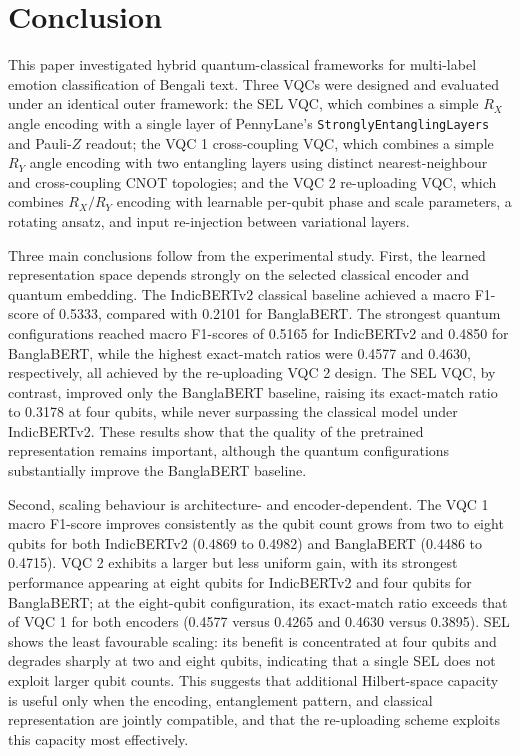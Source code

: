\documentclass[runningheads]{llncs}
\begin{document}
\section{Conclusion}\label{sec:conclusion}
This paper investigated hybrid quantum-classical frameworks for multi-label emotion classification of Bengali text. Three VQCs were designed and evaluated under an identical outer framework: the SEL VQC, which combines a simple $R_X$ angle encoding with a single layer of PennyLane's \texttt{StronglyEntanglingLayers} and Pauli-$Z$ readout; the VQC 1 cross-coupling VQC, which combines a simple $R_Y$ angle encoding with two entangling layers using distinct nearest-neighbour and cross-coupling CNOT topologies; and the VQC 2 re-uploading VQC, which combines $R_X / R_Y$ encoding with learnable per-qubit phase and scale parameters, a rotating ansatz, and input re-injection between variational layers.

Three main conclusions follow from the experimental study. First, the learned representation space depends strongly on the selected classical encoder and quantum embedding. The IndicBERTv2 classical baseline achieved a macro F1-score of 0.5333, compared with 0.2101 for BanglaBERT. The strongest quantum configurations reached macro F1-scores of 0.5165 for IndicBERTv2 and 0.4850 for BanglaBERT, while the highest exact-match ratios were 0.4577 and 0.4630, respectively, all achieved by the re-uploading VQC 2 design. The SEL VQC, by contrast, improved only the BanglaBERT baseline, raising its exact-match ratio to 0.3178 at four qubits, while never surpassing the classical model under IndicBERTv2. These results show that the quality of the pretrained representation remains important, although the quantum configurations substantially improve the BanglaBERT baseline.

Second, scaling behaviour is architecture- and encoder-dependent. The VQC 1 macro F1-score improves consistently as the qubit count grows from two to eight qubits for both IndicBERTv2 (0.4869 to 0.4982) and BanglaBERT (0.4486 to 0.4715). VQC 2 exhibits a larger but less uniform gain, with its strongest performance appearing at eight qubits for IndicBERTv2 and four qubits for BanglaBERT; at the eight-qubit configuration, its exact-match ratio exceeds that of VQC 1 for both encoders (0.4577 versus 0.4265 and 0.4630 versus 0.3895). SEL shows the least favourable scaling: its benefit is concentrated at four qubits and degrades sharply at two and eight qubits, indicating that a single SEL does not exploit larger qubit counts. This suggests that additional Hilbert-space capacity is useful only when the encoding, entanglement pattern, and classical representation are jointly compatible, and that the re-uploading scheme exploits this capacity most effectively.
\end{document}
